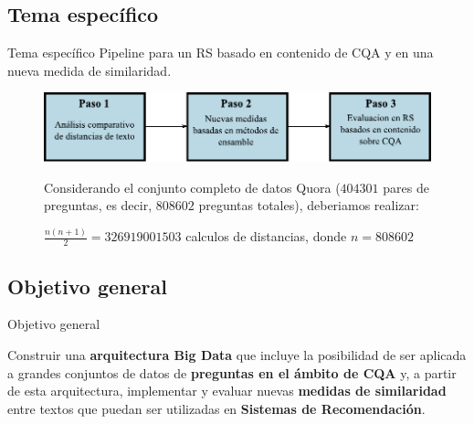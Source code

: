 \subsection{Tema específico}
\begin{frame}[allowframebreaks]{Tema específico}
	Pipeline para un RS basado en contenido de CQA y en una nueva medida de similaridad.
	\medskip
	\begin{figure}
		\centering
		\includegraphics[width=0.7\linewidth]{../5_introduccion/imagenes/pipeline}
		\label{fig:pipeline}

		\framebreak

		Considerando el conjunto completo de datos Quora (\(404301\) pares de preguntas, es decir, \(808602\) preguntas totales), deberiamos realizar:

		\bigskip $\frac{n(n+1)}{2} = 326919001503$ calculos de distancias, donde $n = 808602$
	\end{figure}
\end{frame}

\subsection{Objetivo general}
\begin{frame}{Objetivo general}
	\begin{tcolorbox}[colback=blue!5,colframe=blue!40!black,title=Objetivo general]
		Construir una \textbf{arquitectura Big Data} que incluye la posibilidad de ser aplicada a grandes conjuntos de datos de \textbf{preguntas en el ámbito de CQA} y, a partir de esta arquitectura, implementar y evaluar nuevas \textbf{medidas de similaridad} entre textos que puedan ser utilizadas en \textbf{Sistemas de Recomendación}.
	\end{tcolorbox}
\end{frame}

